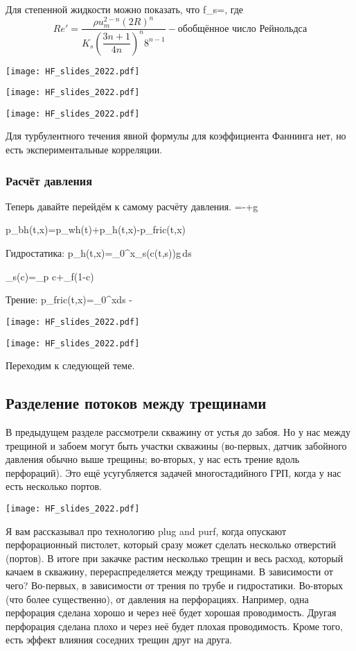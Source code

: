 \documentclass[main.tex]{subfiles}
\begin{document}
Для степенной жидкости можно показать, что
\beq
f_s=,
\eeq
где
$$Re'=\dfrac{\rho u_m^{2-n}(2R)^n}{K_s\left(\dfrac{3n+1}{4n}\right)^n8^{n-1}}-\text{обобщённое число Рейнольдса}$$

\texttt{[image: HF\_slides\_2022.pdf]}

\texttt{[image: HF\_slides\_2022.pdf]}

\texttt{[image: HF\_slides\_2022.pdf]}

Для турбулентного течения явной формулы для коэффициента Фаннинга нет, но есть экспериментальные корреляции.

\subsubsection{Расчёт давления}

Теперь давайте перейдём к самому расчёту давления.
\beq
{}=-+\overline{\rho}g\sin{\theta}
\eeq

\beq
p_{bh}(t,x)=p_{wh}(t)+\Delta p_h(t,x)-\Delta p_{fric}(t,x)
\eeq

Гидростатика:
\beq
\Delta p_h(t,x)=\int\limits_{0}^{x}\rho_s(c(t,s))g\,ds
\eeq

\beq
\rho_s(c)=\rho_p c+\rho_f\left(1-c\right)
\eeq

Трение:
\beq
\Delta p_{fric}(t,x)=\int\limits_0^xds - 
\eeq

\texttt{[image: HF\_slides\_2022.pdf]}

\texttt{[image: HF\_slides\_2022.pdf]}

Переходим к следующей теме.

\subsection{Разделение потоков между трещинами}

В предыдущем разделе рассмотрели скважину от устья до забоя.
Но у нас между трещиной и забоем могут быть участки скважины (во-первых, датчик забойного давления обычно выше трещины; во-вторых, у нас есть трение вдоль перфораций).
Это ещё усугубляется задачей многостадийного ГРП, когда у нас есть несколько портов.

\texttt{[image: HF\_slides\_2022.pdf]}

Я вам рассказывал про технологию plug and purf, когда опускают перфорационный пистолет, который сразу может сделать несколько отверстий (портов).
В итоге при закачке растим несколько трещин и весь расход, который качаем в скважину, перераспределяется между трещинами.
В зависимости от чего?
Во-первых, в зависимости от трения по трубе и гидростатики.
Во-вторых (что более существенно), от давления на перфорациях.
Например, одна перфорация сделана хорошо и через неё будет хорошая проводимость.
Другая перфорация сделана плохо и через неё будет плохая проводимость.
Кроме того, есть эффект влияния соседних трещин друг на друга.
\\
\end{document}
